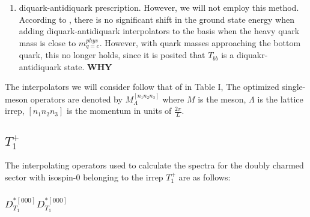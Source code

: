 \begin{table}
\begin{enumerate}
    Fermion-bilinear operators with continuum spin $J$ and momentum $\vec{p}$ are written like so \cite{Cheung_2017}
    \begin{equation}
    \mathcal{O}^{J,m}(\vec{p},t) = \sum_{\vec{x}} e^{i\vec{p}\vec{x}} \bar{q}(\vec{x},t) [\Gamma \overleftrightarrow{D}\dots \overleftrightarrow{D}]^{J,m}q(\vec{x},t)\
\end{equation}
    In the most general form,

    \begin{equation}
        \mathcal{O}_{\Lambda,\mu}^P(\vec{p}=\vec{0},t) = \sum_{\mu_1,\mu_2,\hat{q}} \mathbb{C}(\vec{p} = \vec{0},\Lambda^P,\mu;\vec{q},\Lambda_1,\mu_1;-\vec{q},\Lambda_2,\mu_2) \Omega^{M_1}_{\Lambda_1,\mu_1}(\vec{q},t) \Omega^{M_2}_{\Lambda_2,\mu_2}(-\vec{q},t)
    \end{equation}


    \item diquark-antidiquark prescription. However, we will not employ this method. According to \cite{Pacheco_2023}, there is no significant shift in the ground state energy when adding diquark-antidiquark interpolators to the basis when the heavy quark mass is close to $m_{q=c}^{phys}$. However, with quark masses approaching the bottom quark, this no longer holds, since it is posited that $T_{bb}$ is a diquakr-antidiquark state. \textbf{WHY}
\end{enumerate}

The interpolators we will consider follow that of \cite{Padmanath_2022} in Table I, 
The optimized single-meson operators are denoted by $M^{[n_1n_2n_3]}_{\Lambda}$ where $M$ is the meson, $\Lambda$ is the lattice irrep, $[n_1n_2n_3]$ is the momentum in units of $\frac{2\pi}{L}$.  \cite{Cheung_2017}

\subsection{$T_1^+$}
The interpolating operators used to calculate the spectra for the doubly charmed sector with isospin-0 belonging to the irrep $T_1^+$ are as follows:
\subsubsection*{$D^{*[000]}_{T_1}D^{*[000]}_{T_1}$}




\end{table}

